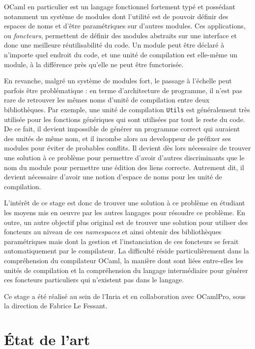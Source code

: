 \documentclass[11pt,a4paper]{report}
\begin{document}
OCaml en particulier est un langage fonctionnel fortement typé et possédant
notamment un système de modules dont l'utilité est de pouvoir définir des
espaces de noms et d'être paramétriques sur d'autres modules. Ces applications,
ou \emph{foncteurs}, permettent de définir des modules abstraits sur une
interface et donc une meilleure réutilisabilité du code. Un module peut être
déclaré à n'importe quel endroit du code, et une unité de compilation est
elle-même un module, à la différence près qu'elle ne peut être functorisée.

En revanche, malgré un système de modules fort, le passage à l'échelle peut
parfois être problématique : en terme d'architecture de programme, il n'est pas
rare de retrouver les mêmes noms d'unité de compilation entre deux
bibliothèques. Par exemple, une unité de compilation \texttt{Utils} est
généralement très utilisée pour les fonctions génériques qui sont utilisées par
tout le reste du code. De ce fait, il devient impossible de générer un programme
correct qui auraient des unités de même nom, et il incombe alors au developpeur
de préfixer ses modules pour éviter de probables conflits. Il devient dès lors
nécessaire de trouver une solution à ce problème pour permettre d'avoir d'autres
discriminants que le nom du module pour permettre une édition des liens
correcte. Autrement dit, il devient nécessaire d'avoir une notion d'espace de
noms pour les unité de compilation.

L'intérêt de ce stage est donc de trouver une solution à ce problème en étudiant
les moyens mis en oeuvre par les autres langages pour résoudre ce problème. En
outre, un autre objectif plus original est de trouver une solution pour utiliser
des foncteurs au niveau de ces \emph{namespaces} et ainsi obtenir des
bibliothèques paramétriques mais dont la gestion et l'instanciation de ces
foncteurs se ferait automatiquement par le compilateur. La difficulté réside
particulièrement dans la compréhension du compilateur OCaml, la manière dont
sont liées entre-elles les unités de compilation et la compréhension du langage
intermédiaire pour générer ces foncteurs particuliers qui n'existent pas dans le
langage.

Ce stage a été réalisé au sein de l'Inria et en collaboration avec OCamlPro,
sous la direction de Fabrice Le Fessant.

\chapter{\'{E}tat de l'art}
\end{document}
